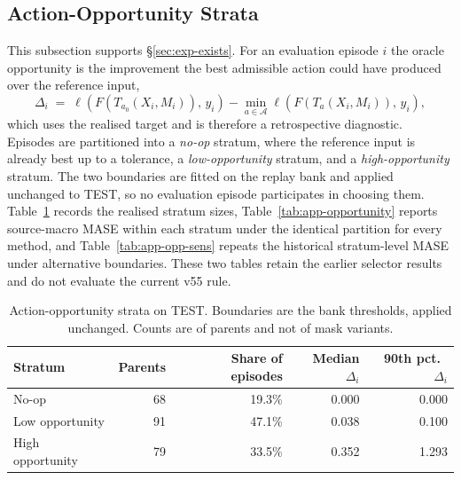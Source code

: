 \documentclass{article}
\newcommand{\calA}{\mathcal{A}}
\newcommand{\loss}{\ell}
\begin{document}
\subsection{Action-Opportunity Strata}
\label{app:opportunity}
This subsection supports \S\ref{sec:exp-exists}. For an evaluation episode $i$ the oracle
opportunity is the improvement the best admissible action could have produced over the
reference input,
\begin{equation}
  \Delta_i \;=\; \loss\!\left(F(T_{a_0}(X_i, M_i)),\, y_i\right) - \min_{a \in \calA} \loss\!\left(F(T_{a}(X_i, M_i)),\, y_i\right),
  \label{eq:opportunity}
\end{equation}
which uses the realised target and is therefore a retrospective diagnostic. Episodes are partitioned into a \emph{no-op} stratum, where the reference input is
already best up to a tolerance, a \emph{low-opportunity} stratum, and a
\emph{high-opportunity} stratum. The two boundaries are fitted on the replay bank and applied
unchanged to TEST, so no evaluation episode participates in choosing them.
Table~\ref{tab:app-opp-sizes} records the realised stratum sizes,
Table~\ref{tab:app-opportunity} reports source-macro MASE within each stratum under the
identical partition for every method, and Table~\ref{tab:app-opp-sens} repeats the
historical stratum-level MASE under alternative boundaries. These two tables retain the earlier selector results and do not evaluate the current v55 rule.

\begin{table}[htbp]
  \caption{Action-opportunity strata on TEST. Boundaries are the bank thresholds, applied
  unchanged. Counts are of parents and not of mask variants.}
  \label{tab:app-opp-sizes}
  \centering
  \small
  \setlength{\tabcolsep}{4pt}
\begin{tabular*}{\textwidth}{@{\extracolsep{\fill}}lrrrr@{}}
    \toprule
    Stratum & Parents & Share of episodes & Median $\Delta_i$ & 90th pct.\ $\Delta_i$ \\
    \midrule
    No-op             & 68  & 19.3\%  & 0.000  & 0.000 \\
    Low opportunity   & 91   & 47.1\%   & 0.038   & 0.100 \\
    High opportunity  & 79  & 33.5\%  & 0.352  & 1.293 \\
    \bottomrule
  \end{tabular*}
\end{table}
\end{document}
